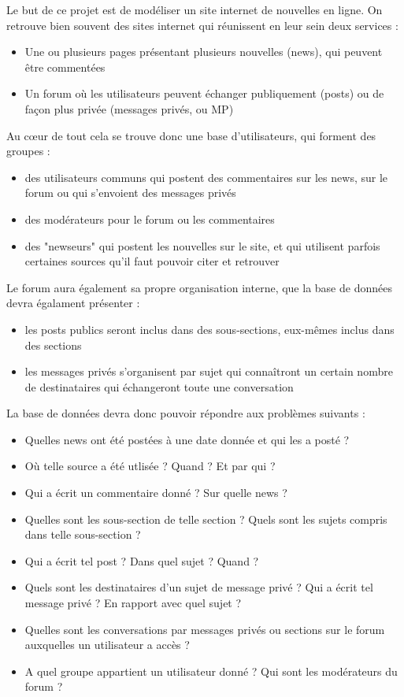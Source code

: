Le but de ce projet est de modéliser un site internet de nouvelles en ligne. On retrouve bien souvent des sites internet qui réunissent en leur sein deux services :
\begin{itemize}
	\item Une ou plusieurs pages présentant plusieurs nouvelles (news), qui peuvent être commentées
	\item Un forum où les utilisateurs peuvent échanger publiquement (posts) ou de façon plus privée (messages privés, ou MP)
\end{itemize}

\smallskip
Au c\oe ur de tout cela se trouve donc une base d'utilisateurs, qui forment des groupes :
\begin{itemize}
	\item des utilisateurs communs qui postent des commentaires sur les news, sur le forum ou qui s'envoient des messages privés
	\item des modérateurs pour le forum ou les commentaires
	\item des "newseurs" qui postent les nouvelles sur le site, et qui utilisent parfois certaines sources qu'il faut pouvoir citer et retrouver
\end{itemize}

\smallskip
Le forum aura également sa propre organisation interne, que la base de données devra égalament présenter :
\begin{itemize}
	\item les posts publics seront inclus dans des sous-sections, eux-mêmes inclus dans des sections
	\item les messages privés s'organisent par sujet qui connaîtront un certain nombre de destinataires qui échangeront toute une conversation
\end{itemize}

\bigskip
La base de données devra donc pouvoir répondre aux problèmes suivants :
\begin{itemize}
	\item Quelles news ont été postées à une date donnée et qui les a posté ?
	\item Où telle source a été utlisée ? Quand ? Et par qui ?
	\item Qui a écrit un commentaire donné ? Sur quelle news ?
	\item Quelles sont les sous-section de telle section ? Quels sont les sujets compris dans telle sous-section ?
	\item Qui a écrit tel post ? Dans quel sujet ? Quand ?
	\item Quels sont les destinataires d'un sujet de message privé ? Qui a écrit tel message privé ? En rapport avec quel sujet ?
	\item Quelles sont les conversations par messages privés ou sections sur le forum auxquelles un utilisateur a accès ?
	\item A quel groupe appartient un utilisateur donné ? Qui sont les modérateurs du forum ? 
\end{itemize}

